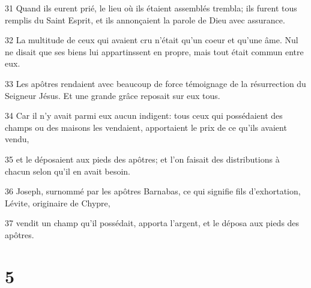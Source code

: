 \par 31 Quand ils eurent prié, le lieu où ils étaient assemblés trembla; ils furent tous remplis du Saint Esprit, et ils annonçaient la parole de Dieu avec assurance.
\par 32 La multitude de ceux qui avaient cru n'était qu'un coeur et qu'une âme. Nul ne disait que ses biens lui appartinssent en propre, mais tout était commun entre eux.
\par 33 Les apôtres rendaient avec beaucoup de force témoignage de la résurrection du Seigneur Jésus. Et une grande grâce reposait sur eux tous.
\par 34 Car il n'y avait parmi eux aucun indigent: tous ceux qui possédaient des champs ou des maisons les vendaient, apportaient le prix de ce qu'ils avaient vendu,
\par 35 et le déposaient aux pieds des apôtres; et l'on faisait des distributions à chacun selon qu'il en avait besoin.
\par 36 Joseph, surnommé par les apôtres Barnabas, ce qui signifie fils d'exhortation, Lévite, originaire de Chypre,
\par 37 vendit un champ qu'il possédait, apporta l'argent, et le déposa aux pieds des apôtres.

\chapter{5}

